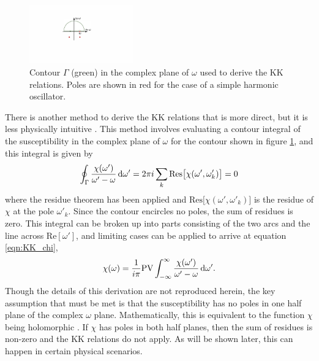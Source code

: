 \begin{figure}
	\centering
	\includegraphics[width=0.4\textwidth]{figures/CATS/KK_no_pump.pdf}
	\caption[Contour used to derive KK relations]{Contour $\Gamma$ (green) in the complex plane of $\omega$ used to derive the KK relations.  Poles are shown in red for the case of a simple harmonic oscillator.}
	\label{fig:KK_contour}
\end{figure}

There is another method to derive the KK relations that is more direct, but it is less physically intuitive \cite{jacksonClassicalElectrodynamics1999, hutchingsKramersKronigRelationsNonlinear1992, lucariniKramersKronigRelationsOptical2005}. This method involves evaluating a contour integral of the susceptibility in the complex plane of $\omega$ for the contour shown in figure \ref{fig:KK_contour}, and this integral is given by 
\begin{equation}
	\label{eqn:contour_int}
	\oint_{\Gamma}\frac{\chi(\omega')}{\omega' - \omega} \mathop{}\!\mathrm{d} \omega' = 2\pi i \sum_{k}\mathrm{Res}\big[ \chi(\omega', \omega'_{k}) \big]=0
\end{equation} 
where the residue theorem has been applied and $\mathrm{Res}\big[ \chi(\omega', \omega'_{k}) \big]$ is the residue of $\chi$ at the pole $\omega'_k$.  Since the contour encircles no poles, the sum of residues is zero.  This integral can be broken up into parts consisting of the two arcs and the line across $\mathrm{Re}[\omega']$, and limiting cases can be applied to arrive at equation \ref{eqn:KK_chi},
\begin{equation}
	\chi(\omega)=\frac{1}{i\pi}\mathrm{PV}\int_{-\infty}^{\infty}\frac{\chi(\omega')}{\omega' - \omega}\mathop{}\!\mathrm{d} \omega'.
\end{equation}
Though the details of this derivation are not reproduced herein, the key assumption that must be met is that the susceptibility has no poles in one half plane of the complex $\omega$ plane.  Mathematically, this is equivalent to the function $\chi$ being holomorphic \cite{lucariniKramersKronigRelationsOptical2005}.  If $\chi$ has poles in both half planes, then the sum of residues is non-zero and the KK relations do not apply.  As will be shown later, this can happen in certain physical scenarios.

